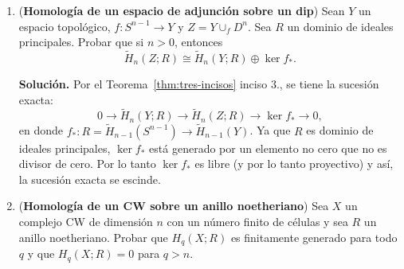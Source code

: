 \documentclass[11pt,a4paper]{article}
\theoremstyle{plain}
\theoremstyle{definition}
\theoremstyle{remark}
\newcommand{\RR}{\mathbb R}
\newcommand{\ZZ}{\mathbb Z}
\begin{document}
\begin{enumerate}[label=\arabic*.,leftmargin=*]
\begin{enumerate}[label=\alph*)]
Recíprocamente, sea $x\in\mathcal H_n-\partial\mathcal H_n$. Entonces,
existe un disco abierto $D$ centrado en $x$. Como $\mathcal H_n-D$ es un
cerrado contenido en el abierto $\mathcal H_n-\{x\}$, por el Teorema de
escisión~\ref{thm:escision}, se tiene que
$H_n(D,D-\{x\})\cong H_n(\mathcal H_n,\mathcal H_n-\{x\})$.

Finalmente, debido a que $h:D\to\RR^n$, $x\mapsto0$, es un homeomorfismo,
$H_n(D,D-\{x\})=\ZZ$ y de esta manera
$H_n(\mathcal H_n,\mathcal H_n-\{x\})=\ZZ$.
\item Si $x\in\mathcal H_n$, el homeomorfismo $\phi$ manda
$\mathcal H_n-\{x\}$ en $\mathcal H_n-\{\phi(x)\}$. Por lo tanto,
\[
H_n(\mathcal H_n,\mathcal H_n-\{x\})\cong H_n(\mathcal H_n,\mathcal H_n-\{\phi(x)\}).
\]
En particular, $\phi(\partial\mathcal H_n)=\partial\mathcal H_n$.
\end{enumerate}

\item (\textbf{Homología de un espacio de adjunción sobre un dip}) Sean $Y$
un espacio topológico, $f:S^{n-1}\to Y$ y $Z=Y\cup_fD^n$. Sea $R$ un
dominio de ideales principales. Probar que si $n>0$, entonces
\[
\tilde H_n(Z;R)\cong\tilde H_n(Y;R)\oplus\ker f_*.
\]

\noindent\textbf{Solución.} Por el Teorema~\ref{thm:tres-incisos} inciso
3., se tiene la sucesión exacta:
\[
0\to\tilde H_n(Y;R)\to\tilde H_n(Z;R)\to\ker f_*\to0,
\]
en donde $f_*:R=\tilde H_{n-1}(S^{n-1})\to\tilde H_{n-1}(Y)$. Ya que $R$ es
dominio de ideales principales, $\ker f_*$ está generado por un elemento no
cero que no es divisor de cero. Por lo tanto $\ker f_*$ es libre (y por lo
tanto proyectivo) y así, la sucesión exacta se escinde.

\item (\textbf{Homología de un CW sobre un anillo noetheriano}) Sea $X$ un
complejo CW de dimensión $n$ con un número finito de células y sea $R$ un
anillo noetheriano. Probar que $H_q(X;R)$ es finitamente generado para todo
$q$ y que $H_q(X;R)=0$ para $q>n$.


\end{enumerate}
\end{document}
